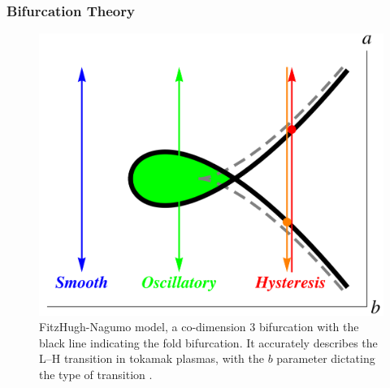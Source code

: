 \documentclass[10pt]{beamer}
\begin{document}
\begin{frame} %
\frametitle{Bifurcation Theory}

\begin{figure}[tb] %
\begin{minipage}{0.59\linewidth}
	\centering
	\includegraphics[width=\textwidth]{../Graphics/Bif_Graphs/3_transitions_single_simple.png}
\end{minipage}
\hfill
\begin{minipage}{0.39\linewidth}
	\caption{FitzHugh-Nagumo model, a co-dimension 3 bifurcation with the black line indicating the fold bifurcation.
	It accurately describes the L--H transition in tokamak plasmas, with the $b$ parameter dictating the type of transition \parencite{weymiens_bifurcation_2014}.}
	\label{fig:co-3}
\end{minipage}
\end{figure}

\end{frame}

\end{document}

